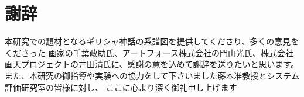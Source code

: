\section*{謝辞}
本研究での題材となるギリシャ神話の系譜図を提供してくださり、多くの意見をくださった
画家の千葉政助氏、アートフォース株式会社の門山光氏、株式会社画天プロジェクトの井田清氏に、感謝の意を込めて謝辞を送りたいと思います。
また、本研究の御指導や実験への協力をして下さいました藤本准教授とシステム評価研究室の皆様に対し、
ここに心より深く御礼申し上げます
